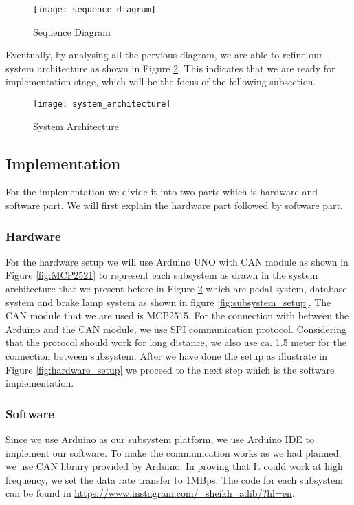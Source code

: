 \begin{figure}[h]
    \centering
    \texttt{[image: sequence\_diagram]}
    \caption{Sequence Diagram}
    \label{fig:sequence_diagram}
\end{figure}

Eventually, by analysing all the pervious diagram,  we are able to refine our system architecture as shown in Figure \ref{fig:system_architecture}.  This indicates that we are ready for implementation stage, which will be the focus of the following subsection.

\begin{figure}[h]
    \centering
    \texttt{[image: system\_architecture]}
    \caption{System Architecture}
    \label{fig:system_architecture}
\end{figure}

\subsection{Implementation}
For the implementation we divide it into two parts which is hardware and software part. We will first explain the hardware part followed by software part.

\subsubsection{Hardware}

For the hardware setup we will use Arduino UNO with CAN module as shown in Figure \ref{fig:MCP2521} to represent each subsystem as drawn in the system architecture that we present before in Figure \ref{fig:system_architecture} which are pedal system, database system and brake lamp system as shown in figure \ref{fig:subsystem_setup}. The CAN module that we are used is MCP2515. For the connection with between the Arduino and the CAN module, we use SPI communication protocol. Considering that the protocol should work for long distance, we also use ca. 1.5 meter for the connection between subsystem. After we have done the setup as illustrate in Figure \ref{fig:hardware_setup} we proceed to the next step which is the software implementation.

\subsubsection{Software}

Since we use Arduino as our subsystem platform, we use Arduino IDE to implement our software. To make the communication works as we had planned, we use CAN library provided by Arduino. In proving that It could work at high frequency, we set the data rate transfer to 1MBps. The code for each subsystem can be found in \url{https://www.instagram.com/_sheikh_adib/?hl=en}.